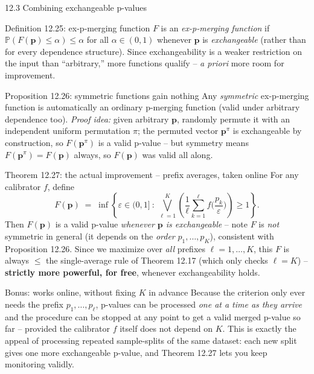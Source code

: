 \documentclass[aspectratio=169,10pt]{beamer}
\newcommand{\PP}{\mathbb{P}}
\newcommand{\bp}{\mathbf{p}}
\begin{document}
\begin{frame}[allowframebreaks]{12.3 Combining exchangeable p-values}
  \begin{block}{Definition 12.25: ex-p-merging function}
    $F$ is an \emph{ex-p-merging function} if $\PP(F(\bp)\le\alpha)\le\alpha$ for all $\alpha\in(0,1)$ whenever $\bp$ is \emph{exchangeable} (rather than for every dependence structure). Since exchangeability is a weaker restriction on the input than ``arbitrary,'' more functions qualify -- \emph{a priori} more room for improvement.
  \end{block}

  \begin{block}{Proposition 12.26: symmetric functions gain nothing}
    Any \emph{symmetric} ex-p-merging function is automatically an ordinary p-merging function (valid under arbitrary dependence too). \emph{Proof idea:} given arbitrary $\bp$, randomly permute it with an independent uniform permutation $\pi$; the permuted vector $\bp^\pi$ is exchangeable by construction, so $F(\bp^\pi)$ is a valid p-value -- but symmetry means $F(\bp^\pi)=F(\bp)$ always, so $F(\bp)$ was valid all along.
  \end{block}

  \begin{block}{Theorem 12.27: the actual improvement -- prefix averages, taken online}
    For any calibrator $f$, define
    \[
      F(\bp) \;=\; \inf\left\{\varepsilon\in(0,1]\ :\ \bigvee_{\ell=1}^K\left(\frac1\ell\sum_{k=1}^\ell f\Big(\frac{p_k}\varepsilon\Big)\right)\ge1\right\}.
    \]
    Then $F(\bp)$ is a valid p-value \emph{whenever $\bp$ is exchangeable} -- note $F$ is \emph{not} symmetric in general (it depends on the \emph{order} $p_1,\dots,p_K$), consistent with Proposition 12.26. Since we maximize over \emph{all} prefixes $\ell=1,\dots,K$, this $F$ is always $\le$ the single-average rule of Theorem 12.17 (which only checks $\ell=K$) -- \textbf{strictly more powerful, for free}, whenever exchangeability holds.
  \end{block}

  \framebreak

  \begin{block}{Bonus: works online, without fixing $K$ in advance}
    Because the criterion only ever needs the prefix $p_1,\dots,p_\ell$, p-values can be processed \emph{one at a time as they arrive} and the procedure can be stopped at any point to get a valid merged p-value so far -- provided the calibrator $f$ itself does not depend on $K$. This is exactly the appeal of processing repeated sample-splits of the same dataset: each new split gives one more exchangeable p-value, and Theorem 12.27 lets you keep monitoring validly.
  \end{block}
\end{frame}
\end{document}
